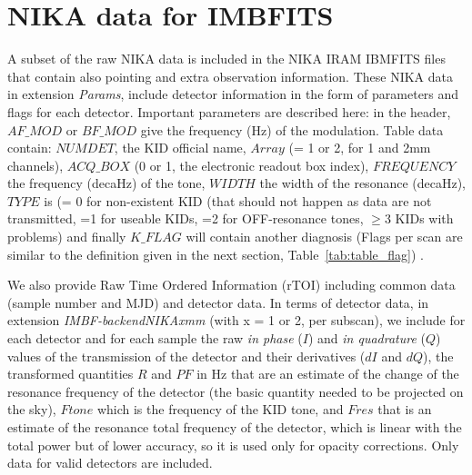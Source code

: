 \documentclass[a4paper,10pt]{article}
\begin{document}
\section{NIKA data for IMBFITS}
A subset of the raw NIKA data is included in the NIKA IRAM IBMFITS files that
contain also pointing and extra observation information. These NIKA data in
extension {\sl Params}, include detector information in the form of parameters
and flags for each detector. Important parameters are described here: in the
header, $AF\_MOD$ or $BF\_MOD$ give the frequency (Hz) of the
modulation. Table data contain: $NUMDET$, the KID official name, $Array$ (= 1
or 2, for 1 and 2mm channels), $ACQ\_BOX$ (0 or 1, the electronic readout box
index), $FREQUENCY$ the frequency (decaHz) of the tone, $WIDTH$ the width of
the resonance (decaHz), $TYPE$ is (= 0 for non-existent KID (that should not
happen as data are not transmitted, =1 for useable KIDs, =2 for OFF-resonance
tones, $\ge 3$ KIDs with problems) and finally $K\_FLAG$ will contain another
diagnosis (Flags per scan are similar to the definition given in the next
section, Table~\ref{tab:table_flag}) .


We also provide Raw Time Ordered Information (rTOI) including common data
(sample number and MJD) and detector data. In terms of detector data, in
extension {\sl IMBF-backendNIKAxmm} (with x = 1 or 2, per subscan), we include
for each detector and for each sample the raw {\it in phase} ($I$) and {\it in
  quadrature} ($Q$) values of the transmission of the detector and their
derivatives ($dI$ and $dQ$), the transformed quantities $R$ and $PF$ in Hz
that are an estimate of the change of the resonance frequency of the detector
(the basic quantity needed to be projected on the sky), $Ftone$ which is the
frequency of the KID tone, and $Fres$ that is an estimate of the resonance
total frequency of the detector, which is linear with the total power but of
lower accuracy, so it is used only for opacity corrections. Only data for
valid detectors are included.
\end{document}
